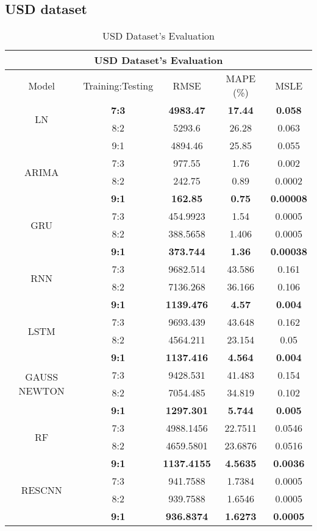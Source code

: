 \documentclass{ieeeojies}
\begin{document}
\subsection{USD dataset} 
\begin{table}[H]
    \centering
    \begin{tabular}{|c|c|c|c|c|}
         \hline
         \multicolumn{5}{|c|}{\textbf{USD Dataset's Evaluation}}\\
         \hline
         \centering Model & Training:Testing & RMSE & MAPE (\%) & MSLE\\
         \hline
         \multirow{2}{*}{LN} & \textbf{7:3}&\textbf{4983.47}&\textbf{17.44}&\textbf{0.058} \\ & 8:2 &  5293.6 & 26.28 & 0.063 \\ & 9:1&4894.46&25.85&0.055\\
         \hline
         \multirow{2}{*}{ARIMA} & 7:3&977.55&1.76&0.002 \\ & 8:2&242.75&0.89&0.0002 \\ & \textbf{9:1} & \textbf{162.85} & \textbf{0.75} & \textbf{0.00008}\\
         \hline
         \multirow{2}{*}{GRU} & 7:3&454.9923&1.54&0.0005 \\ &  8:2&388.5658&1.406&	0.0005 \\ & \textbf{9:1} & \textbf{373.744} & \textbf{1.36} & \textbf{0.00038}\\
         \hline
         \multirow{2}{*}{RNN} & 7:3 & 9682.514 & 43.586 & 0.161 \\ & 8:2 & 7136.268 & 36.166 & 0.106 \\ & \textbf{9:1} & \textbf{1139.476} & \textbf{4.57} & \textbf{0.004}\\
         \hline
         \multirow{2}{*}{LSTM} & 7:3 & 9693.439 & 43.648&0.162 \\ &8:2 & 4564.211 & 23.154 & 0.05 \\ &  \textbf{9:1} &  \textbf{1137.416} &  \textbf{4.564} &  \textbf{0.004}\\
         \hline
         \multirow{2}{*}{GAUSS NEWTON} & 7:3 & 9428.531 & 41.483 & 0.154 \\ & 8:2 & 7054.485 & 34.819 & 0.102\\ & \textbf{9:1} & \textbf{1297.301} & \textbf{5.744} & \textbf{0.005}\\
         \hline
         \multirow{2}{*}{RF} & 7:3 &  4988.1456 & 22.7511 & 0.0546 \\ & 8:2 & 4659.5801 & 23.6876 & 0.0516 \\ & \textbf{9:1} &  \textbf{1137.4155} &	\textbf{4.5635} & 	\textbf{0.0036} \\
         \hline
         \multirow{2}{*}{RESCNN} & 7:3 & 941.7588 &  1.7384 &  0.0005 \\ & 8:2 & 939.7588 &  1.6546 &  0.0005 \\ & \textbf{9:1} & \textbf{936.8374} & \textbf{1.6273} & \textbf{0.0005}\\
         \hline
    \end{tabular}
    \caption{USD Dataset's Evaluation}
    \label{mbbresult}
\end{table}
\end{document}
